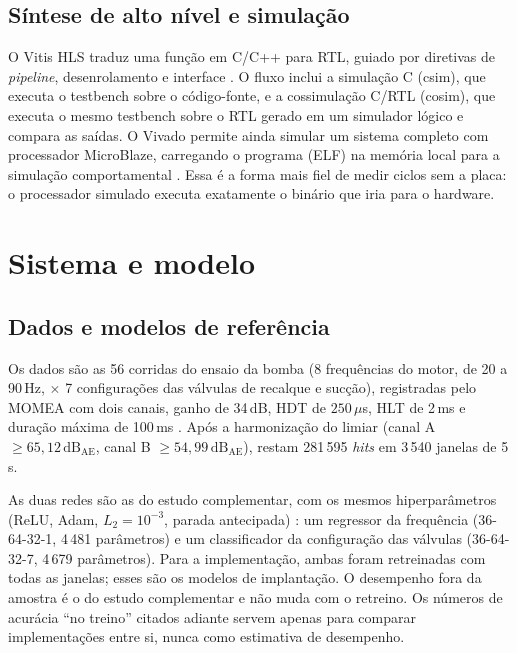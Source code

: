 \documentclass[12pt]{article}
\begin{document}
\subsection{Síntese de alto nível e simulação}

O Vitis HLS traduz uma função em C/C++ para RTL, guiado por diretivas de \textit{pipeline}, desenrolamento e interface \cite{amd_ug1399}. O fluxo inclui a simulação C (csim), que executa o testbench sobre o código-fonte, e a cossimulação C/RTL (cosim), que executa o mesmo testbench sobre o RTL gerado em um simulador lógico e compara as saídas. O Vivado permite ainda simular um sistema completo com processador MicroBlaze, carregando o programa (ELF) na memória local para a simulação comportamental \cite{amd_ug900,amd_ug984}. Essa é a forma mais fiel de medir ciclos sem a placa: o processador simulado executa exatamente o binário que iria para o hardware.

\section{Sistema e modelo}
\label{sec:sistema}

\subsection{Dados e modelos de referência}

Os dados são as 56 corridas do ensaio da bomba (8 frequências do motor, de 20 a 90\,Hz, \(\times\) 7 configurações das válvulas de recalque e sucção), registradas pelo MOMEA com dois canais, ganho de 34\,dB, HDT de \(250\,\mu\)s, HLT de 2\,ms e duração máxima de 100\,ms \cite{mlpbomba2026}. Após a harmonização do limiar (canal A \(\ge 65{,}12\,\mathrm{dB_{AE}}\), canal B \(\ge 54{,}99\,\mathrm{dB_{AE}}\)), restam 281\,595 \textit{hits} em 3\,540 janelas de 5\,s.

As duas redes são as do estudo complementar, com os mesmos hiperparâmetros (ReLU, Adam, \(L_2 = 10^{-3}\), parada antecipada) \cite{pedregosa2011,prechelt1998}: um regressor da frequência (36-64-32-1, 4\,481 parâmetros) e um classificador da configuração das válvulas (36-64-32-7, 4\,679 parâmetros). Para a implementação, ambas foram retreinadas com todas as janelas; esses são os modelos de implantação. O desempenho fora da amostra é o do estudo complementar e não muda com o retreino. Os números de acurácia ``no treino'' citados adiante servem apenas para comparar implementações entre si, nunca como estimativa de desempenho.
\end{document}
